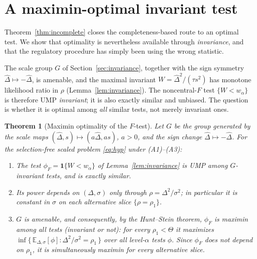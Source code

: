\documentclass[11pt]{article}
\newtheorem{theorem}{Theorem}
\theoremstyle{remark}
\newcommand{\Dhat}{\hat{\Delta}}
\newcommand{\E}{\mathbb{E}}
\newcommand{\ind}{\mathbf{1}}
\begin{document}
\section{A maximin-optimal invariant test}\label{sec:optimal}

Theorem~\ref{thm:incomplete} closes the completeness-based route to an optimal test. We show that optimality is nevertheless available through \emph{invariance}, and that the regulatory procedure has simply been using the wrong statistic.

The scale group $G$ of Section~\ref{sec:invariance}, together with the sign symmetry $\Dhat\mapsto-\Dhat$, is amenable, and the maximal invariant $W=\Dhat^2/(\tau s^2)$ has monotone likelihood ratio in $\rho$ (Lemma~\ref{lem:invariance}). The noncentral-$F$ test $\{W<w_\alpha\}$ is therefore UMP \emph{invariant}; it is also exactly similar and unbiased. The question is whether it is optimal among \emph{all} similar tests, not merely invariant ones.

\begin{theorem}[Maximin optimality of the $F$-test]\label{thm:maximin}
Let $G$ be the group generated by the scale maps $(\Dhat,s)\mapsto(a\Dhat,as)$, $a>0$, and the sign change $\Dhat\mapsto-\Dhat$. For the selection-free scaled problem \eqref{eq:hyp} under \textnormal{(A1)--(A3)}:
\begin{enumerate}
\item[(a)] The test $\phi_F=\ind\{W<w_\alpha\}$ of Lemma~\ref{lem:invariance} is UMP among $G$-invariant tests, and is exactly similar.
\item[(b)] Its power depends on $(\Delta,\sigma)$ only through $\rho=\Delta^2/\sigma^2$; in particular it is \emph{constant in $\sigma$} on each alternative slice $\{\rho=\rho_1\}$.
\item[(c)] $G$ is amenable, and consequently, by the Hunt--Stein theorem, $\phi_F$ is \emph{maximin among all tests} (invariant or not): for every $\rho_1<\Theta$ it maximizes
$\inf\{\,\E_{\Delta,\sigma}[\phi] : \Delta^2/\sigma^2=\rho_1\,\}$
over all level-$\alpha$ tests $\phi$. Since $\phi_F$ does not depend on $\rho_1$, it is simultaneously maximin for every alternative slice.
\end{enumerate}
\end{theorem}
\end{document}
